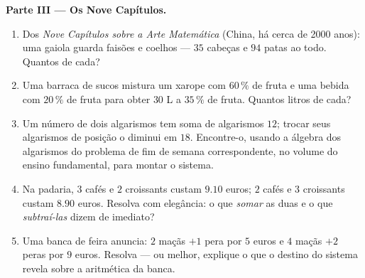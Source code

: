 \begin{problem}
\medskip
\noindent\textbf{Parte III --- Os Nove Capítulos.}
\begin{enumerate}[resume]
  \item Dos \emph{Nove Capítulos sobre a Arte Matemática}
        (China, há cerca de 2000 anos): uma gaiola guarda faisões
        e coelhos --- $35$ cabeças e $94$ patas ao todo. Quantos
        de cada?
  \item Uma barraca de sucos mistura um xarope com $60\,\%$ de
        fruta e uma bebida com $20\,\%$ de fruta para obter
        $30$ L a $35\,\%$ de fruta. Quantos litros de cada?
  \item Um número de dois algarismos tem soma de algarismos $12$;
        trocar seus algarismos de posição o diminui em $18$.
        Encontre-o, usando a álgebra dos algarismos do problema
        de fim de semana correspondente, no volume do ensino
        fundamental, para montar o sistema.
  \item Na padaria, $3$ cafés e $2$ croissants custam $9.10$
        euros; $2$ cafés e $3$ croissants custam $8.90$ euros.
        Resolva com elegância: o que \emph{somar} as duas
         e o que \emph{subtraí-las} dizem de imediato?
  \item Uma banca de feira anuncia: $2$ maçãs $+ 1$ pera por
        $5$ euros e $4$ maçãs $+ 2$ peras por $9$ euros. Resolva
        --- ou melhor, explique o que o destino do sistema revela
        sobre a aritmética da banca.
\end{enumerate}


\end{problem}
